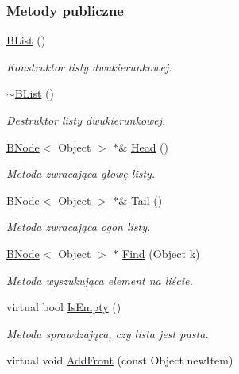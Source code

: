 \subsubsection*{Metody publiczne}
\begin{DoxyCompactItemize}
\item 
\hyperlink{class_b_list_a5c2484087706cf974e47ea4dfb6c83ca}{B\-List} ()
\begin{DoxyCompactList}\small\item\em Konstruktor listy dwukierunkowej. \end{DoxyCompactList}\item 
\hyperlink{class_b_list_a370a72d6aece919c9cc048563077eab8}{$\sim$\-B\-List} ()
\begin{DoxyCompactList}\small\item\em Destruktor listy dwukierunkowej. \end{DoxyCompactList}\item 
\hyperlink{class_b_node}{B\-Node}$<$ Object $>$ $\ast$\& \hyperlink{class_b_list_a985da34d870b50fd254568206c6d2522}{Head} ()
\begin{DoxyCompactList}\small\item\em Metoda zwracająca głowę listy. \end{DoxyCompactList}\item 
\hyperlink{class_b_node}{B\-Node}$<$ Object $>$ $\ast$\& \hyperlink{class_b_list_a8b8f2f947c10fedf2a49cbe59f7f4d6f}{Tail} ()
\begin{DoxyCompactList}\small\item\em Metoda zwracająca ogon listy. \end{DoxyCompactList}\item 
\hyperlink{class_b_node}{B\-Node}$<$ Object $>$ $\ast$ \hyperlink{class_b_list_af7803b6789c78625383905e167fe1f3c}{Find} (Object k)
\begin{DoxyCompactList}\small\item\em Metoda wyszukująca element na liście. \end{DoxyCompactList}\item 
virtual bool \hyperlink{class_b_list_ae69bf69a67a46e5a3a0a9ba743354b2b}{Is\-Empty} ()
\begin{DoxyCompactList}\small\item\em Metoda sprawdzająca, czy lista jest pusta. \end{DoxyCompactList}\item 
virtual void \hyperlink{class_b_list_a3ce77cc9d73682bfac57c70dafdce89d}{Add\-Front} (const Object new\-Item)
\item 

\end{DoxyCompactItemize}
